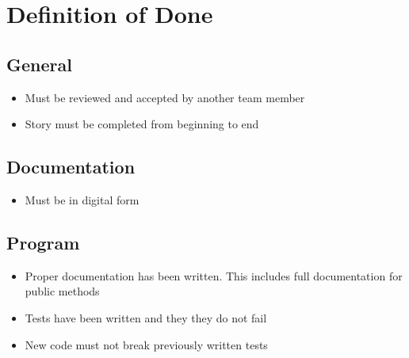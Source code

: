 \section{Definition of Done}
\subsection{General}
\begin{itemize}
  \item Must be reviewed and accepted by another team member
  \item Story must be completed from beginning to end
\end{itemize}

\subsection{Documentation}
\begin{itemize}
  \item Must be in digital form
\end{itemize}

\subsection{Program}
\begin{itemize}
  \item Proper documentation has been written. This includes full documentation for public methods
  \item Tests have been written and they they do not fail
  \item New code must not break previously written tests
\end{itemize}
\newpage